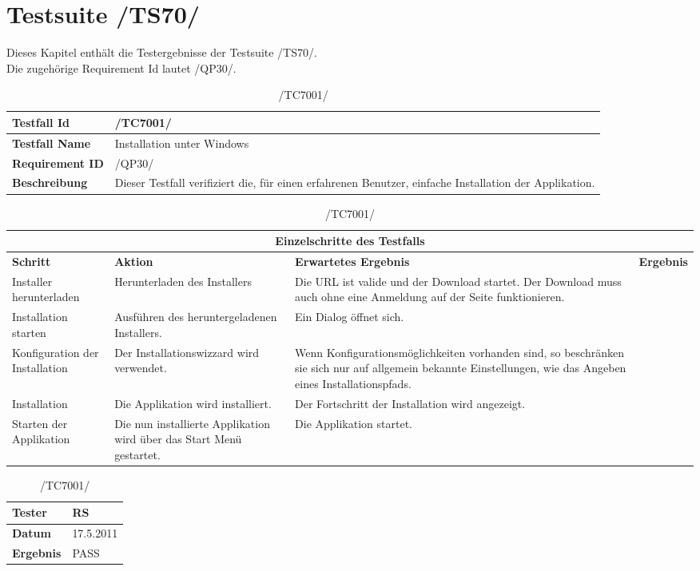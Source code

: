 \chapter{Testsuite /TS70/}
Dieses Kapitel enthält die Testergebnisse der Testsuite /TS70/.\\
Die zugehörige Requirement Id lautet /QP30/.

\begin{table}[h]
\caption{/TC7001/}
\label{tab:TC7001}
\begin{center}
\begin{tabular}{|p{3.5cm}|p{11cm}|}
\hline
\textbf{Testfall Id} & /TC7001/\\
\hline
\textbf{Testfall Name} & Installation unter Windows\\
\hline
\textbf{Requirement ID} & /QP30/\\
\hline
\textbf{Beschreibung} & Dieser Testfall verifiziert die, für einen erfahrenen Benutzer, einfache Installation der Applikation.\\
\hline
\end{tabular}
\begin{tabular}{|p{2cm}|p{3.9cm}|p{3.9cm}|p{3.8cm}|}
\multicolumn{4}{|c|}{\textbf{Einzelschritte des Testfalls}} \\
\hline
\textbf{Schritt} & \textbf{Aktion} & \textbf{Erwartetes Ergebnis} & \textbf{Ergebnis}\\
\hline
Installer herunterladen & Herunterladen des Installers & Die URL ist valide und der Download startet. Der Download muss auch ohne eine Anmeldung auf der Seite funktionieren.\\
\hline
Installation starten & Ausführen des heruntergeladenen Installers. & Ein Dialog öffnet sich. \\
\hline
Konfiguration der Installation & Der Installationswizzard wird verwendet. & Wenn Konfigurationsmöglichkeiten vorhanden sind, so beschränken sie sich nur auf allgemein bekannte Einstellungen, wie das Angeben eines Installationspfads.\\
\hline
Installation & Die Applikation wird installiert. & Der Fortschritt der Installation wird angezeigt. \\
\hline
Starten der Applikation & Die nun installierte Applikation wird über das Start Menü gestartet. & Die Applikation startet. \\
\hline
\end{tabular}
\begin{tabular}{|p{3.5cm}|p{11cm}|}
\textbf{Tester} & RS\\
\hline
\textbf{Datum} & 17.5.2011\\
\hline
\textbf{Ergebnis} & PASS\\
\hline
\end{tabular}
\end{center}
\label{default}
\end{table}

